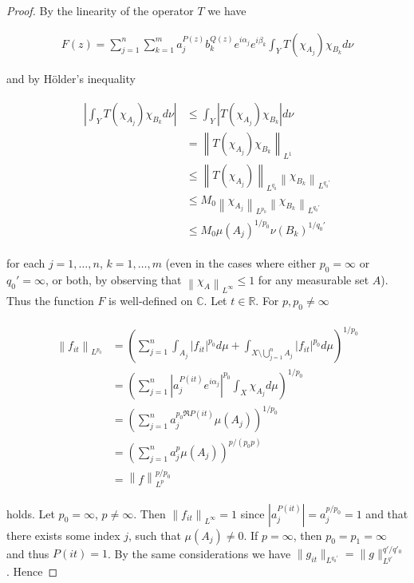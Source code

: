 \begin{proof}
By the linearity of the operator $T$ we have

\begin{gather*}
	F(z) = \sum_{j = 1}^n\sum_{k = 1}^m a^{P(z)}_j b_k^{Q(z)} e^{i\alpha_j} e^{i\beta_k} \int_YT(\chi_{A_j})\chi_{B_k}d\nu
\end{gather*}

and by H\"older's inequality

\begin{gather}
	\begin{aligned}
		\left| \int_YT(\chi_{A_j})\chi_{B_k}d\nu \right| &\leqslant \int_Y\left| T(\chi_{A_j})\chi_{B_k}\right|d\nu\\
		&= \left\|T(\chi_{A_j})\chi_{B_k}\right\|_{L^1}\\
		&\leqslant \left\|T(\chi_{A_j})\right\|_{L^{q_0}} \left\|\chi_{B_k}\right\|_{L^{q_0'}}\\
		&\leqslant M_0\left\|\chi_{A_j}\right\|_{L^{p_0}} \left\|\chi_{B_k}\right\|_{L^{q_0'}}\\
		&\leqslant M_0 \mu\left(A_j\right)^{1/p_0}\nu\left(B_k\right)^{1/q_0'}
	\end{aligned}
	\label{est:constant_F}
\end{gather}

for each $j = 1,\hdots,n$, $k = 1,\hdots,m$ (even in the cases where either $p_0 = \infty$ or $q_0' = \infty$, or both, by observing that $\left\| \chi_{A}\right\|_{L^\infty} \leqslant 1$ for any measurable set $A$). Thus the function $F$ is well-defined on $\mathbb{C}$. Let $t \in \mathbb{R}$. For $p,p_0 \neq \infty$

\begin{gather*}
	\begin{aligned}
		\left\|f_{it}\right\|_{L^{p_0}} &= \left(\sum_{j = 1}^n \int_{A_j} \left| f_{it} \right|^{p_0} d\mu + \int_{X \setminus \bigcup_{j = 1}^n A_j} \left| f_{it} \right|^{p_0} d\mu\right)^{1/p_0}\\
		&= \left(\sum_{j = 1}^n \left| a_j^{P(it)} e^{i\alpha_j}\right|^{p_0}\int_X \chi_{A_j} d\mu\right)^{1/p_0}\\
		&= \left(\sum_{j = 1}^n a_j^{p_0\Re P(it)}\mu\left(A_j\right)\right)^{1/p_0}\\
		&= \left(\sum_{j = 1}^n a_j^p\mu\left(A_j\right)\right)^{p/\left(p_0p\right)}\\
		&= \left\|f\right\|_{L^p}^{p/p_0} 
	\end{aligned}
\end{gather*}

holds. Let $p_0 = \infty$, $p \neq \infty$. Then $\left\|f_{it}\right\|_{L^{\infty}} = 1$ since $\left| a_j^{P(it)}\right| = a_j^{p/p_0} = 1$ and that there exists some index $j$, such that $\mu\left( A_j \right) \neq 0$. If $p = \infty$, then $p_0 = p_1 = \infty$ and thus $P(it) = 1$. By the same considerations we have $\|g_{it}\|_{L^{q_0'}} = \|g\|_{L^{q'}}^{q'/q'_0}$. Hence


\end{proof}
